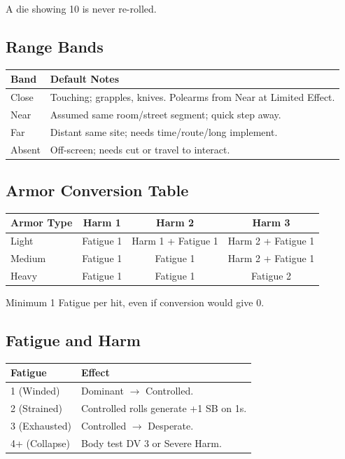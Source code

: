 A die showing 10 is never re-rolled.

\subsection{Range Bands}

\begin{tabular}{@{}lp{9cm}@{}}
\toprule
\textbf{Band} & \textbf{Default Notes} \\
\midrule
Close & Touching; grapples, knives. Polearms from Near at Limited Effect. \\
Near & Assumed same room/street segment; quick step away. \\
Far & Distant same site; needs time/route/long implement. \\
Absent & Off-screen; needs cut or travel to interact. \\
\bottomrule
\end{tabular}

\subsection{Armor Conversion Table}

\begin{tabular}{@{}lccc@{}}
\toprule
\textbf{Armor Type} & \textbf{Harm 1} & \textbf{Harm 2} & \textbf{Harm 3} \\
\midrule
Light  & Fatigue 1 & Harm 1 + Fatigue 1 & Harm 2 + Fatigue 1 \\
Medium & Fatigue 1 & Fatigue 1 & Harm 2 + Fatigue 1 \\
Heavy  & Fatigue 1 & Fatigue 1 & Fatigue 2 \\
\bottomrule
\end{tabular}

Minimum 1 Fatigue per hit, even if conversion would give 0.

\subsection{Fatigue and Harm}

\begin{tabular}{@{}ll@{}}
\toprule
\textbf{Fatigue} & \textbf{Effect} \\
\midrule
1 (Winded) & Dominant $\rightarrow$ Controlled. \\
2 (Strained) & Controlled rolls generate +1 SB on 1s. \\
3 (Exhausted) & Controlled $\rightarrow$ Desperate. \\
4+ (Collapse) & Body test DV 3 or Severe Harm. \\
\bottomrule
\end{tabular}

